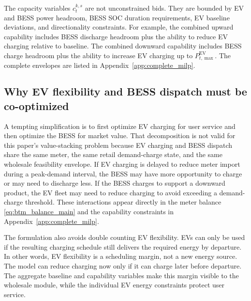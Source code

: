 \documentclass[final,5p,times]{elsarticle}
\newcommand{\EV}{\mathrm{EV}}
\begin{document}
The capacity variables $c_t^{k,s}$ are not unconstrained bids. They are bounded by EV and BESS power headroom, BESS SOC duration requirements, EV baseline deviations, and directionality constraints. For example, the combined upward capability includes BESS discharge headroom plus the ability to reduce EV charging relative to baseline. The combined downward capability includes BESS charge headroom plus the ability to increase EV charging up to $P_{t,\max}^{\EV}$. The complete envelopes are listed in Appendix~\ref{app:complete_milp}.

\subsection{Why EV flexibility and BESS dispatch must be co-optimized}
A tempting simplification is to first optimize EV charging for user service and then optimize the BESS for market value. That decomposition is not valid for this paper's value-stacking problem because EV charging and BESS dispatch share the same meter, the same retail demand-charge state, and the same wholesale feasibility envelope. If EV charging is delayed to reduce meter import during a peak-demand interval, the BESS may have more opportunity to charge or may need to discharge less. If the BESS charges to support a downward product, the EV fleet may need to reduce charging to avoid exceeding a demand-charge threshold. These interactions appear directly in the meter balance \eqref{eq:btm_balance_main} and the capability constraints in Appendix~\ref{app:complete_milp}.

The formulation also avoids double counting EV flexibility. EVs can only be used if the resulting charging schedule still delivers the required energy by departure. In other words, EV flexibility is a scheduling margin, not a new energy source. The model can reduce charging now only if it can charge later before departure. The aggregate baseline and capability variables make this margin visible to the wholesale module, while the individual EV energy constraints protect user service.
\end{document}
